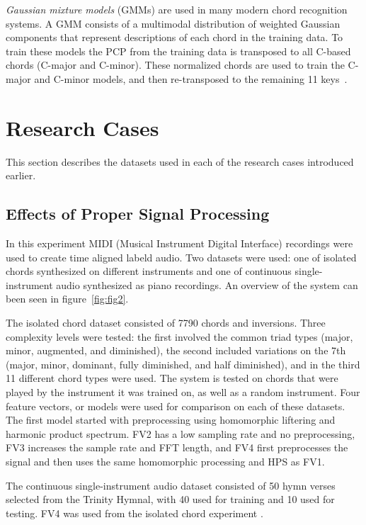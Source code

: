 \documentclass{sig-alternate}
\begin{document}
\textit{Gaussian mixture models} (GMMs) are used in many modern chord recognition systems. A GMM consists of a multimodal distribution of weighted Gaussian components that represent descriptions of each chord in the training data. To train these models the PCP from the training data is transposed to all C-based chords (C-major and C-minor). These normalized chords are used to train the C-major and C-minor models, and then re-transposed to the remaining 11 keys~\cite{TaeMin:2014}.

\section{Research Cases}

This section describes the datasets used in each of the research cases introduced earlier.

\subsection{Effects of Proper Signal Processing}

In this experiment MIDI (Musical Instrument Digital Interface) recordings were used to create time aligned labeld audio. Two datasets were used: one of isolated chords synthesized on different instruments and one of continuous single-instrument audio synthesized as piano recordings. An overview of the system can been seen in figure~\ref{fig:fig2}. 

The isolated chord dataset consisted of 7790 chords and inversions. Three complexity levels were tested: the first involved the common triad types (major, minor, augmented, and diminished), the second included variations on the 7th (major, minor, dominant, fully diminished, and half diminished), and in the third 11 different chord types were used. The system is tested on chords that were played by the instrument it was trained on, as well as a random instrument. Four feature vectors, or models were used for comparison on each of these datasets. The first model started with preprocessing using homomorphic liftering and harmonic product spectrum. FV2 has a low sampling rate and no preprocessing, FV3 increases the sample rate and FFT length, and FV4 first preprocesses the signal and then uses the same homomorphic processing and HPS as FV1.


The continuous single-instrument audio dataset consisted of 50 hymn verses selected from the Trinity Hymnal, with 40 used for training and 10 used for testing. FV4 was used from the isolated chord experiment \cite{Morman:2006}. 
\end{document}
